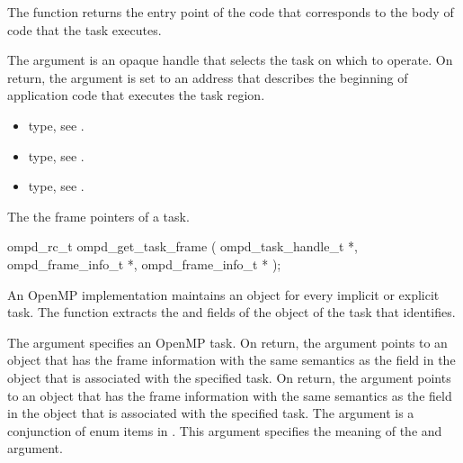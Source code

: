 \descr
The  function returns the entry point of the code
that corresponds to the body of code that the task executes.

\argdesc
The  argument is an opaque handle that selects the task 
on which to operate. On return, the  argument is set to
an address that describes the beginning of application code that executes 
the task region.

\crossreferences
\begin{itemize}
\item {} type, see .

\item {} type, see .

\item {} type, see .
\end{itemize}



\label{subsubsubsec:ompd_get_task_frame}
\summary
The \code{} the frame pointers of a task.

\format
\begin{cspecific}
\begin{ompSyntax}
ompd_rc_t ompd_get_task_frame (
  ompd_task_handle_t *,
  ompd_frame_info_t *,
  ompd_frame_info_t *
);
\end{ompSyntax}
\end{cspecific}

\descr
An OpenMP implementation  maintains an  object for every 
implicit or explicit task. The  function extracts 
the  and  fields of the  
object of the task that  identifies.

\argdesc
The  argument specifies an OpenMP task. On return, the 
 argument points to an  object  
that has the frame information with the same semantics as the  
field in the  object that is associated with the specified 
task. On return, the  argument points to an 
 object that has the frame information with the same 
semantics as the  field in the  object 
that is associated with the specified task. The  argument 
is a conjunction of enum items in . This argument 
specifies the meaning of the  and  argument.

